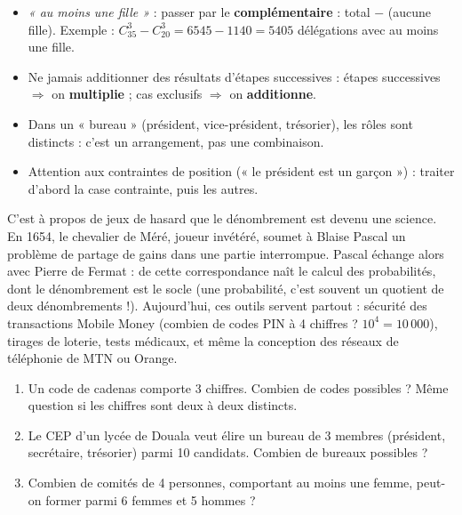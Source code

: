 \documentclass[11pt]{article}
\newcommand{\cle}[1]{{\popxbold\color{popdark}#1}}
\begin{document}
\begin{attention}
\begin{itemize}
\item \emph{« au moins une fille »} : passer par le \textbf{complémentaire} : total $-$ (aucune fille). Exemple : $C_{35}^3 - C_{20}^3 = 6545 - 1140 = 5405$ délégations avec au moins une fille.
\item Ne jamais additionner des résultats d'étapes successives : étapes successives $\Rightarrow$ on \textbf{multiplie} ; cas exclusifs $\Rightarrow$ on \textbf{additionne}.
\item Dans un « bureau » (président, vice-président, trésorier), les rôles sont distincts : c'est un arrangement, pas une combinaison.
\item Attention aux contraintes de position (« le président est un garçon ») : traiter d'abord la case contrainte, puis les autres.
\end{itemize}
\end{attention}

\begin{savaistu}
C'est à propos de jeux de hasard que le dénombrement est devenu une science. En 1654, le chevalier de Méré, joueur invétéré, soumet à Blaise \cle{Pascal} un problème de partage de gains dans une partie interrompue. Pascal échange alors avec Pierre de \cle{Fermat} : de cette correspondance naît le calcul des probabilités, dont le dénombrement est le socle (une probabilité, c'est souvent un quotient de deux dénombrements !). Aujourd'hui, ces outils servent partout : sécurité des transactions Mobile Money (combien de codes PIN à 4 chiffres ? $10^4 = 10\,000$), tirages de loterie, tests médicaux, et même la conception des réseaux de téléphonie de MTN ou Orange.
\end{savaistu}

\begin{exercice}
\begin{enumerate}
\item Un code de cadenas comporte 3 chiffres. Combien de codes possibles ? Même question si les chiffres sont deux à deux distincts.
\item Le CEP d'un lycée de Douala veut élire un bureau de 3 membres (président, secrétaire, trésorier) parmi 10 candidats. Combien de bureaux possibles ?
\item Combien de comités de 4 personnes, comportant au moins une femme, peut-on former parmi 6 femmes et 5 hommes ?
\end{enumerate}
\end{exercice}
\end{document}
